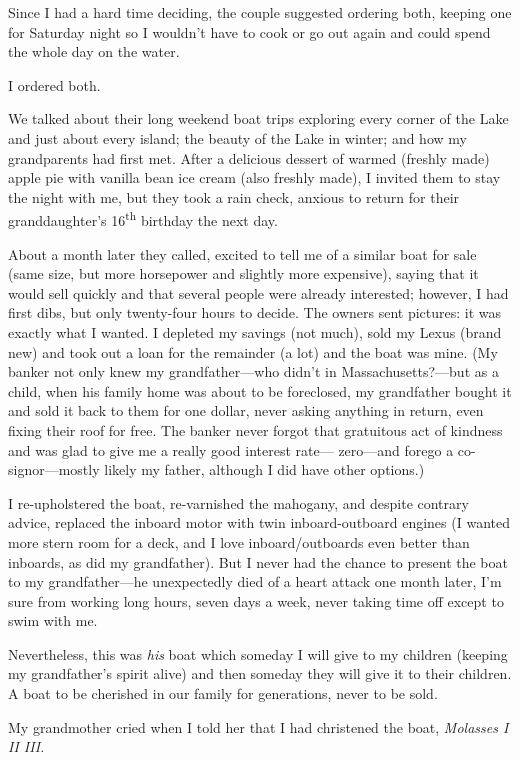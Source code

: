 Since I had a hard time deciding, the couple suggested ordering both,
keeping one for Saturday night so I wouldn't have to cook or go out
again and could spend the whole day on the water.

I ordered both.

We talked about their long weekend boat trips exploring every corner of
the Lake and just about every island; the beauty of the Lake in winter;
and how my grandparents had first met. After a delicious dessert of
warmed (freshly made) apple pie with vanilla bean ice cream (also
freshly made), I invited them to stay the night with me, but they took a
rain check, anxious to return for their granddaughter's
16\textsuperscript{th} birthday the next day.

About a month later they called, excited to tell me of a similar boat
for sale (same size, but more horsepower and slightly more expensive),
saying that it would sell quickly and that several people were already
interested; however, I had first dibs, but only twenty-four hours to
decide. The owners sent pictures: it was exactly what I wanted. I
depleted my savings (not much), sold my Lexus (brand new) and took out a
loan for the remainder (a lot) and the boat was mine. (My banker not
only knew my grandfather---who didn't in Massachusetts?---but as a
child, when his family home was about to be foreclosed, my grandfather
bought it and sold it back to them for one dollar, never asking anything
in return, even fixing their roof for free. The banker never forgot that
gratuitous act of kindness and was glad to give me a really good
interest rate--- zero---and forego a co-signor---mostly likely my
father, although I did have other options.)

I re-upholstered the boat, re-varnished the mahogany, and despite
contrary advice, replaced the inboard motor with twin inboard-outboard
engines (I wanted more stern room for a deck, and I love
inboard/outboards even better than inboards, as did my grandfather). But
I never had the chance to present the boat to my grandfather---he
unexpectedly died of a heart attack one month later, I'm sure from
working long hours, seven days a week, never taking time off except to
swim with me.

Nevertheless, this was \emph{his} boat which someday I will give to my
children (keeping my grandfather's spirit alive) and then someday they
will give it to their children. A boat to be cherished in our family for
generations, never to be sold.

My grandmother cried when I told her that I had christened the boat,
\emph{Molasses I II III.}

